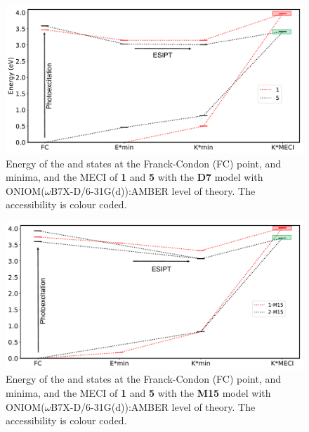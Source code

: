 \begin{figure}
\centering
  \includegraphics[width=0.8\linewidth]{4IntraInterInteractions/D7.pdf}
  \caption[Decay mechanism in the molecular crystal in \textbf{D7} model]{Energy of the \szero{} and \sone{} states at the  Franck-Condon (FC) point, \Estar{} and \Kstar{} minima, and the MECI of \textbf{1} and \textbf{5} with the \textbf{D7} model with ONIOM($\omega$B7X-D/6-31G(d)):AMBER level of theory. The accessibility is colour coded.}
  \label{figure: Solid_Mechanism_D7}
\end{figure}

\begin{figure}
\centering
  \includegraphics[width=0.8\linewidth]{4IntraInterInteractions/M15.pdf}
    \caption[Decay mechanism in the molecular crystal in \textbf{M15} model]{Energy of the \szero{} and \sone{} states at the  Franck-Condon (FC) point, \Estar{} and \Kstar{} minima, and the MECI of \textbf{1} and \textbf{5} with the \textbf{M15} model with ONIOM($\omega$B7X-D/6-31G(d)):AMBER level of theory. The accessibility is colour coded.}
  \label{figure: Solid_Mechanism_M15}
\end{figure}

